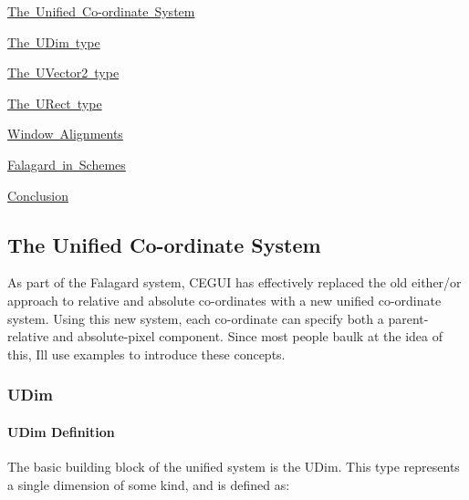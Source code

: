 \begin{DoxyItemize}
\item \mbox{\hyperlink{fal_intro_fal_unifiedsystem}{The Unified Co-\/ordinate System}}
\item \mbox{\hyperlink{fal_intro_fal_udim}{The U\+Dim type}}
\item \mbox{\hyperlink{fal_intro_fal_uvector2}{The U\+Vector2 type}}
\item \mbox{\hyperlink{fal_intro_fal_urect}{The U\+Rect type}}
\item \mbox{\hyperlink{fal_intro_fal_window_alignments}{Window Alignments}}
\item \mbox{\hyperlink{fal_intro_fal_schemes}{Falagard in Schemes}}
\item \mbox{\hyperlink{fal_intro_fal_conclusion}{Conclusion}}
\end{DoxyItemize}\hypertarget{fal_intro_fal_unifiedsystem}{}\subsection{The Unified Co-\/ordinate System}\label{fal_intro_fal_unifiedsystem}
As part of the Falagard system, C\+E\+G\+UI has effectively replaced the old either/or approach to relative and absolute co-\/ordinates with a new \textquotesingle{}unified\textquotesingle{} co-\/ordinate system. Using this new system, each co-\/ordinate can specify both a parent-\/relative and absolute-\/pixel component. Since most people baulk at the idea of this, I\textquotesingle{}ll use examples to introduce these concepts.\hypertarget{fal_intro_fal_udim}{}\subsubsection{U\+Dim}\label{fal_intro_fal_udim}
\hypertarget{fal_intro_fal_udim_def}{}\paragraph{U\+Dim Definition}\label{fal_intro_fal_udim_def}
The basic building block of the unified system is the U\+Dim. This type represents a single dimension of some kind, and is defined as\+: 
\begin{DoxyCode}{0}
\end{DoxyCode}


